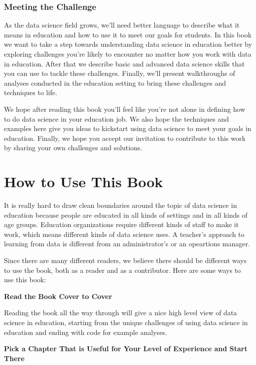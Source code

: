 \documentclass[]{book}
\begin{document}
\subsection{Meeting the Challenge}\label{meeting-the-challenge}

As the data science field grows, we'll need better language to describe
what it means in education and how to use it to meet our goals for
students. In this book we want to take a step towards understanding data
science in education better by exploring challenges you're likely to
encounter no matter how you work with data in education. After that we
describe basic and advanced data science skills that you can use to
tackle these challenges. Finally, we'll present walkthroughs of analyses
conducted in the education setting to bring these challenges and
techniques to life.

We hope after reading this book you'll feel like you're not alone in
defining how to do data science in your education job. We also hope the
techniques and examples here give you ideas to kickstart using data
science to meet your goals in education. Finally, we hope you accept our
invitation to contribute to this work by sharing your own challenges and
solutions.

\chapter{How to Use This Book}\label{how-to-use-this-book}

It is really hard to draw clean boundaries around the topic of data
science in education because people are educated in all kinds of
settings and in all kinds of age groups. Education organizations require
different kinds of staff to make it work, which means different kinds of
data science uses. A teacher's approach to learning from data is
different from an administrator's or an opeartions manager.

Since there are many different readers, we believe there should be
different ways to use the book, both as a reader and as a contributor.
Here are some ways to use this book:

\textbf{Read the Book Cover to Cover}

Reading the book all the way through will give a nice high level view of
data science in education, starting from the unique challenges of using
data science in education and ending with code for example analyses.

\textbf{Pick a Chapter That is Useful for Your Level of Experience and
Start There}
\end{document}
